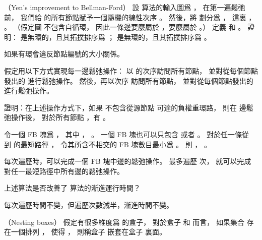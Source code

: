 \startsubject[
  title={Problems},
]

\startPROBLEM
（Yen’s improvement to Bellman-Ford）
設  算法的輸入圖爲 ，
在第一遍鬆弛前，
我們給  的所有節點賦予一個隨機的線性次序 。
然後，將  劃分爲 ，
這裏 ， 。
（假定圖  不包含自循環，
因此一條邊要麼屬於 ，要麼屬於 。）
定義  和 。
\startigBase[a]\startitem
證明：  是無環的，且其拓撲排序爲 ；
  是無環的，且其拓撲排序爲 。
\stopitem\stopigBase

\startANSWER
如果有環會違反節點編號的大小關係。
\stopANSWER

假定用以下方式實現每一邊鬆弛操作：
以  的次序訪問所有節點，
並對從每個節點發出的  進行鬆弛操作。
然後，再以次序  訪問所有節點，
並對從每個節點發出的  進行鬆弛操作。

\startigBase[continue]\startitem
證明：在上述操作方式下，如果  不包含從源節點  可達的負權重環路，
則在  邊鬆弛操作後，
對於所有節點 ，有 。
\stopitem\stopigBase

\startANSWER
令一個 FB 塊爲 ，
其中 ， 。
一個 FB 塊也可以只包含  或者 。
對於任一條從  到  的最短路徑 ，
令其所含不相交的 FB 塊數目最小爲 。
則 ， 。

每次遍歷時，可以完成一個 FB 塊中邊的鬆弛操作。
最多遍歷  次，
就可以完成對任一最短路徑中所有邊的鬆弛操作。
\stopANSWER

\startigBase[continue]\startitem
上述算法是否改善了  算法的漸進運行時間？
\stopitem\stopigBase

\startANSWER
每次遍歷時間不變，但遍歷次數減半，漸進時間不變。
\stopANSWER
\stopPROBLEM

\startPROBLEM
（Nesting boxes）
假定有很多維度爲  的盒子，
對於盒子  和  而言，
如果集合  存在一個排列 \m{\pi}，
使得 ，
則稱盒子  {\EMP 嵌套}在盒子  裏面。

